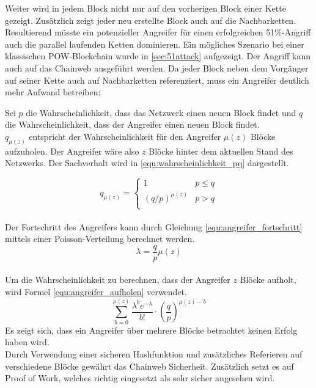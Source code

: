 Weiter wird in jedem Block nicht nur auf den vorherigen Block einer Kette gezeigt. Zusätzlich zeigt jeder neu erstellte Block auch auf die Nachbarketten. Resultierend müsste ein potenzieller Angreifer für einen erfolgreichen 51\%-Angriff auch die parallel laufenden Ketten dominieren. Ein mögliches Szenario bei einer klassischen POW-Blockchain wurde in \eqref{sec:51attack} aufgezeigt. Der Angriff kann auch auf das Chainweb ausgeführt werden. Da jeder Block neben dem Vorgänger auf seiner Kette auch auf Nachbarketten referenziert, muss ein Angreifer deutlich mehr Aufwand betreiben:

Sei $p$ die  Wahrscheinlichkeit, dass das Netzwerk einen neuen Block findet und $q$ die Wahrscheinlichkeit, dass der Angreifer einen neuen Block findet.\\
$q_{\mu(z)}$ entspricht der Wahrscheinlichkeit für den Angreifer $\mu(z)$ Blöcke aufzuholen. Der Angreifer wäre also $z$ Blöcke hinter dem aktuellen Stand des Netzwerks. Der Sachverhalt wird in \eqref{equ:wahrscheinlichkeit_pq} dargestellt.

\begin{equation}
  q_{\mu(z)} =
   \begin{cases}
    1 & \text{$p \leq q$}\\
    (q/p)^{\mu(z)} & \text{$p > q$}\\
    \end{cases}   
\label{equ:wahrscheinlichkeit_pq}
\end{equation}
\\
Der Fortschritt des Angreifers kann durch Gleichung \eqref{equ:angreifer_fortschritt} mittels einer Poisson-Verteilung berechnet werden.
\begin{equation}
    \lambda = \frac{q}{p}\mu(z)
\label{equ:angreifer_fortschritt}
\end{equation}
\\
Um die Wahrscheinlichkeit zu berechnen, dass der Angreifer $z$ Blöcke aufholt, wird Formel \eqref{equ:angreifer_aufholen} verwendet.
\begin{equation}
    \sum_{b=0}^{\mu(z)} \frac{\lambda^{b}e^{-\lambda}}{b!} \cdot \left(\frac{q}{p}\right)^{\mu(z)-b}
\label{equ:angreifer_aufholen}
\end{equation}
Es zeigt sich, dass ein Angreifer über mehrere Blöcke betrachtet keinen Erfolg haben wird. \cite{Martino.2018} \cite{Martino.2018b}
\\
Durch Verwendung einer sicheren Hashfunktion und zusätzliches Referieren auf verschiedene Blöcke gewährt das Chainweb Sicherheit. Zusätzlich setzt es auf Proof of Work, welches richtig eingesetzt als sehr sicher angesehen wird. \cite{Gervais.2016}


